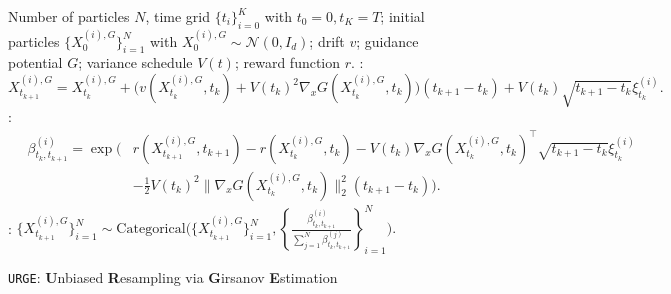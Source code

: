 \documentclass{article}
\theoremstyle{plain}
\theoremstyle{definition}
\theoremstyle{remark}
\begin{document}
\begin{figure}[!ht]
    \begin{minipage}{0.95\textwidth}
    \vspace{-0.2in}
    \begin{algorithm}[H]
    \caption{\texttt{URGE}: \textbf{U}nbiased \textbf{R}esampling via \textbf{G}irsanov \textbf{E}stimation}
    \begin{algorithmic}[1]
    \REQUIRE 
    Number of particles $N$, time grid \(\{t_i\}_{i=0}^K\) with \(t_0=0,t_K=T\); 
    initial particles $\{X_0^{(i),G}\}_{i=1}^N$ with $X_0^{(i),G}\sim \mathcal{N}(0,I_d)$; 
    drift $v$; guidance potential $G$; 
    variance schedule $V(t)$; reward function $r$.
            :
            \[
            X_{t_{k+1}}^{(i),G} 
            = X_{t_k}^{(i),G} 
            + \big(v(X_{t_k}^{(i),G},t_k) + V({t_k})^2 \nabla_x G(X_{t_k}^{(i),G},t_k)\big)(t_{k+1}-t_k)
            + V({t_k})\sqrt{t_{k+1}-t_k}\xi_{t_k}^{(i)}.\]
            : $
            \begin{aligned}
                \quad \beta_{t_k,t_{k+1}}^{(i)}
                = \exp\Big(
                &r(X_{t_{k+1}}^{(i),G},t_{k+1}) - r(X_{t_k}^{(i),G},t_k)
                - V(t_k)\nabla_x G(X_{t_k}^{(i),G},t_k)^\top \sqrt{t_{k+1}-t_k}\xi_{t_k}^{(i)}\\
                &- \tfrac12 V(t_k)^2 \|\nabla_x G(X_{t_k}^{(i),G},t_k)\|_2^2 (t_{k+1}-t_k)
                \Big).
            \end{aligned}
            $
        \ENDFOR
        :
        \(
        \{X_{t_{k+1}}^{(i),G}\}_{i=1}^N 
        \sim 
        \textrm{Categorical}\bigg(
            \{X_{t_{k+1}}^{(i),G}\}_{i=1}^N,
            \left\{\frac{\beta_{t_k,t_{k+1}}^{(i)}}{\sum_{j=1}^N \beta_{t_k,t_{k+1}}^{(j)}}\right\}_{i=1}^N
        \bigg).
        \)
    \ENDFOR
    \end{algorithmic}
    \label{alg:urge}
    \end{algorithm}
    \vspace{-0.25in}
    \end{minipage}
\end{figure}
    
\end{document}
